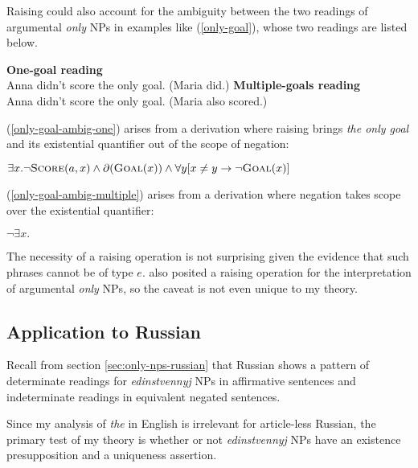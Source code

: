 Raising could also account for the ambiguity between the two readings of argumental \textit{only} NPs in examples like (\ref{only-goal}), whose two readings are listed below.

\begin{exe}
	\ex \label{only-goal-ambig-one} \textbf{One-goal reading} \\ Anna didn't score the only goal. (Maria did.)
	\ex \label{only-goal-ambig-multiple} \textbf{Multiple-goals reading} \\ Anna didn't score the only goal. (Maria also scored.)
\end{exe}

(\ref{only-goal-ambig-one}) arises from a derivation where raising brings \textit{the only goal} and its existential quantifier out of the scope of negation:

\begin{exe}
	\ex $\exists x . \neg \textsc{Score}(a, x) \land \partial(\textsc{Goal}(x)) \land \forall y [ x \ne y \to \neg \textsc{Goal}(x) ]$
\end{exe}

(\ref{only-goal-ambig-multiple}) arises from a derivation where negation takes scope over the existential quantifier:

\begin{exe}
	\ex $\neg \exists x . $
\end{exe}

The necessity of a raising operation is not surprising given the evidence that such phrases cannot be of type $e$. \citet{cb2015} also posited a raising operation for the interpretation of argumental \textit{only} NPs, so the caveat is not even unique to my theory.

\subsection{Application to Russian}
Recall from section \ref{sec:only-nps-russian} that Russian shows a pattern of determinate readings for \textit{edinstvennyj} NPs in affirmative sentences and indeterminate readings in equivalent negated sentences.

Since my analysis of \textit{the} in English is irrelevant for article-less Russian, the primary test of my theory is whether or not \textit{edinstvennyj} NPs have an existence presupposition and a uniqueness assertion.


